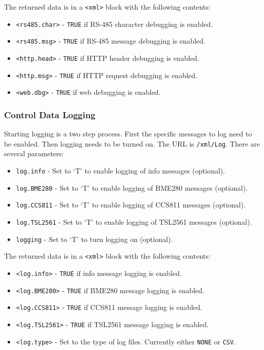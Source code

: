\documentclass[10pt, openany, draft]{article}
\begin{document}
The returned data is in a \texttt{<xml>} block with the following contents:
\begin{itemize}
  \item \texttt{<rs485.char>} - \texttt{TRUE} if RS-485 character debugging is enabled.
  \item \texttt{<rs485.msg>} - \texttt{TRUE} if RS-485 message debugging is enabled.
  \item \texttt{<http.head>} - \texttt{TRUE} if HTTP header debugging is enabled.
  \item \texttt{<http.msg>} - \texttt{TRUE} if HTTP request debugging is enabled.
  \item \texttt{<web.dbg>} - \texttt{TRUE} if web debugging is enabled.
\end{itemize}

\subsubsection{Control Data Logging}
Starting logging is a two step process.  First the specific messages to log need to be enabled.  Then logging needs to be turned on.  The URL is \texttt{/xml/Log}.  There are several parameters:
\begin{itemize}
  \item \texttt{log.info} - Set to `T' to enable logging of info messages (optional).
  \item \texttt{log.BME280} - Set to `T' to enable logging of BME280 messages (optional).
  \item \texttt{log.CCS811} - Set to `T' to enable logging of CCS811 messages (optional).
  \item \texttt{log.TSL2561} - Set to `T' to enable logging of TSL2561 messages (optional).
  \item \texttt{logging} - Set to `T' to turn logging on (optional).
\end{itemize}

The returned data is in a \texttt{<xml>} block with the following contents:
\begin{itemize}
  \item \texttt{<log.info>} - \texttt{TRUE} if info message logging is enabled.
  \item \texttt{<log.BME280>} - \texttt{TRUE} if BME280 message logging is enabled.
  \item \texttt{<log.CCS811>} - \texttt{TRUE} if CCS811 message logging is enabled.
  \item \texttt{<log.TSL2561>} - \texttt{TRUE} if TSL2561 message logging is enabled.
  \item \texttt{<log.type>} - Set to the type of log files.  Currently either \texttt{NONE} or \texttt{CSV}.
\end{itemize}
\end{document}
